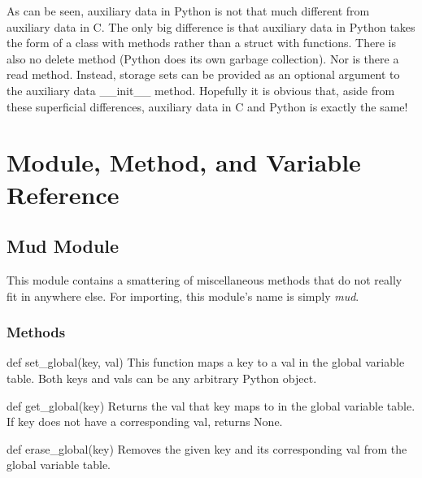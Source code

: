\documentclass[12pt]{article}
\begin{document}
As can be seen, auxiliary data in Python is not that much different from auxiliary data in C. The only big difference is that auxiliary data in Python takes the form of a class with methods rather than a struct with functions. There is also no delete method (Python does its own garbage collection). Nor is there a read method. Instead, storage sets can be provided as an optional argument to the auxiliary data \_\_init\_\_ method. Hopefully it is obvious that, aside from these superficial differences, auxiliary data in C and Python is exactly the same!





\newpage \section{Module, Method, and Variable Reference}

\subsection{Mud Module}
This module contains a smattering of miscellaneous methods that do not really fit in anywhere else. For importing, this module's name is simply {\it mud}.

\subsubsection{Methods}
def set\_global(key, val) \newline
This function maps a key to a val in the global variable table. Both keys and vals can be any arbitrary Python object.

def get\_global(key) \newline
Returns the val that key maps to in the global variable table. If key does not have a corresponding val, returns None.

def erase\_global(key) \newline
Removes the given key and its corresponding val from the global variable table.
\end{document}
